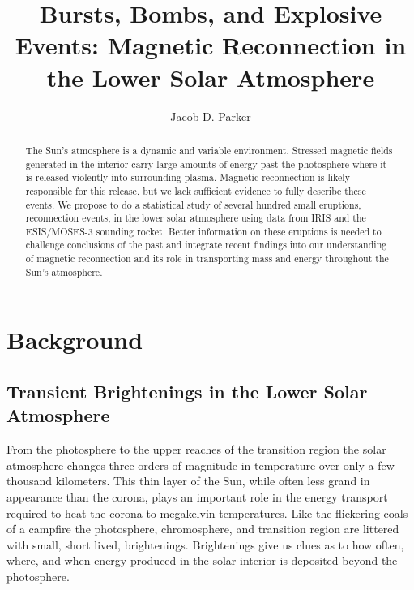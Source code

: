 \documentclass[]{aastex6}
\begin{document}
\title{Bursts, Bombs, and Explosive Events: Magnetic Reconnection in the Lower Solar Atmosphere} 

\author{Jacob D. Parker}





\begin{abstract}
	The Sun's atmosphere is a dynamic and variable environment.  Stressed magnetic fields generated in the interior carry large amounts of energy past the photosphere where it is released violently into surrounding plasma.  Magnetic reconnection is likely responsible for this release, but we lack sufficient evidence to fully describe these events.  We propose to do a statistical study of several hundred small eruptions, reconnection events, in the lower solar atmosphere using data from IRIS and the ESIS/MOSES-3 sounding rocket.  Better information on these eruptions is needed to challenge conclusions of the past and integrate recent findings into our understanding of magnetic reconnection and its role in transporting mass and energy throughout the Sun's atmosphere.

\end{abstract}

\section{Background}

	
	\subsection{Transient Brightenings in the Lower Solar Atmosphere}
	
	
	From the photosphere to the upper reaches of the transition region the solar atmosphere changes three orders of magnitude in temperature over only a few thousand kilometers.  This thin layer of the Sun, while often less grand in appearance than the corona, plays an important role in the energy transport required to heat the corona to megakelvin temperatures.  Like the flickering coals of a campfire the photosphere, chromosphere, and transition region are littered with small, short lived, brightenings.  Brightenings give us clues as to how often, where, and when energy produced in the solar interior is deposited beyond the photosphere.
	
\end{document}
